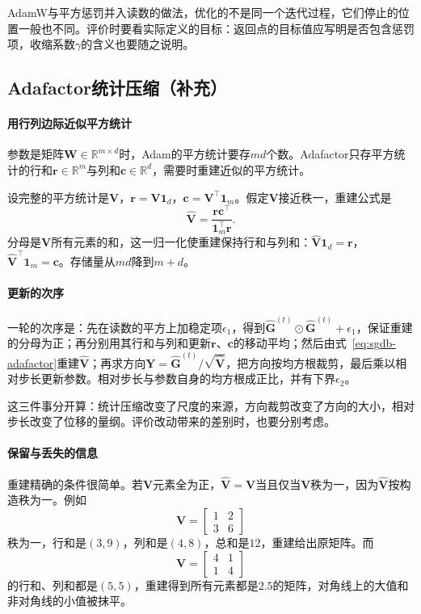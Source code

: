 AdamW与平方惩罚并入读数的做法，优化的不是同一个迭代过程，它们停止的位置一般也不同。评价时要看实际定义的目标：返回点的目标值应写明是否包含惩罚项，收缩系数$\gamma$的含义也要随之说明。

\subsection{Adafactor统计压缩（补充）}
\label{sec:sgdb-adafactor}

\paragraph{用行列边际近似平方统计}
参数是矩阵$\bm{W}\in\mathbb{R}^{m\times d}$时，Adam的平方统计要存$md$个数。Adafactor只存平方统计的行和$\bm{r}\in\mathbb{R}^m$与列和$\bm{c}\in\mathbb{R}^d$，需要时重建近似的平方统计。

设完整的平方统计是$\bm{V}$，$\bm{r}=\bm{V}\bm{1}_d$，$\bm{c}=\bm{V}^\top\bm{1}_m$。假定$\bm{V}$接近秩一，重建公式是
\begin{equation}
 \hat{\bm V}=\frac{\bm{r}\bm{c}^\top}{\bm{1}_m^\top\bm{r}} .
 \label{eq:sgdb-adafactor}
\end{equation}
分母是$\bm{V}$所有元素的和，这一归一化使重建保持行和与列和：$\hat{\bm V}\bm{1}_d=\bm{r}$，$\hat{\bm V}^\top\bm{1}_m=\bm{c}$。存储量从$md$降到$m+d$。

\paragraph{更新的次序}
一轮的次序是：先在读数的平方上加稳定项$\epsilon_1$，得到$\hat{\bm G}^{(t)}\odot\hat{\bm G}^{(t)}+\epsilon_1$，保证重建的分母为正；再分别用其行和与列和更新$\bm{r}$、$\bm{c}$的移动平均；然后由式~\eqref{eq:sgdb-adafactor}重建$\hat{\bm V}$；再求方向$\bm{Y}=\hat{\bm G}^{(t)}/\sqrt{\hat{\bm V}}$，把方向按均方根裁剪，最后乘以相对步长更新参数。相对步长与参数自身的均方根成正比，并有下界$\epsilon_2$。

这三件事分开算：统计压缩改变了尺度的来源，方向裁剪改变了方向的大小，相对步长改变了位移的量纲。评价改动带来的差别时，也要分别考虑。

\paragraph{保留与丢失的信息}
重建精确的条件很简单。若$\bm{V}$元素全为正，$\hat{\bm V}=\bm{V}$当且仅当$\bm{V}$秩为一，因为$\hat{\bm V}$按构造秩为一。例如
\[
 \bm{V}=\begin{bmatrix}1&2\\3&6\end{bmatrix}
\]
秩为一，行和是$(3,9)$，列和是$(4,8)$，总和是$12$，重建给出原矩阵。而
\[
 \bm{V}=\begin{bmatrix}4&1\\1&4\end{bmatrix}
\]
的行和、列和都是$(5,5)$，重建得到所有元素都是$2.5$的矩阵，对角线上的大值和非对角线的小值被抹平。


